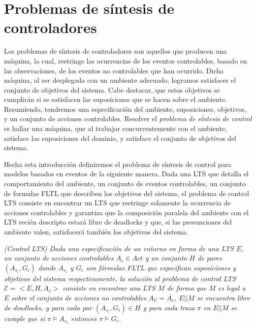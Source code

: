 \section{Problemas de síntesis de controladores}

Los problemas de síntesis de controladores son aquellos que producen una máquina, la cual, restringe las ocurrencias de
los eventos controlables, basado en las observaciones, de los eventos no controlables que han ocurrido. Dicha máquina, al
ser desplegada con un ambiente adecuado, logramos satisfacer el conjunto de objetivos del sistema. Cabe destacar, que
estos objetivos se cumplirán si se satisfacen las suposiciones que se hacen sobre el ambiente. Resumiendo, tendremos una
especificación del ambiente, suposiciones, objetivos, y un conjunto de acciones controlables. Resolver el \emph{problema
de síntesis de control} es hallar una máquina, que al trabajar concurrentemente con el ambiente, satisface las
suposiciones del dominio, y satisface el conjunto de objetivos del sistema.

Hecha esta introducción definiremos el problema de síntesis de control para modelos basados en eventos de la siguiente
manera. Dada una LTS que detalla el comportamiento del ambiente, un conjunto de eventos controlables, un conjunto de
formulas FLTL que describen los objetivos del sistema, el problema de control LTS consiste en encontrar un LTS que
restringe solamente la ocurrencia de acciones controlables y garantiza que la composición paralela del ambiente con el
LTS recién descripto estará libre de deadlocks y que, si las presunciones del ambiente valen, satisfacerá también los
objetivos del sistema.

\begin{nahaDef}
    \label{LTS_control}
    \emph{(Control LTS) Dada una especificación de un entorno en forma de una LTS $E$, un conjunto de acciones
    controlables $A_c \in Act$ y un conjunto $H$ de pares $(A_{s_i}, G_i)$ donde $A_{s_i}$ y $G_i$ son fórmulas FLTL
    que especifican suposiciones y objetivos del sistema respectivamente, la solución al problema de control LTS
    $\mathcal{E} = <E,H,A_c>$ consiste en encontrar una LTS $M$ de forma que $M$ es legal a $E$ sobre el conjunto de acciones
    no controlables $A_U = \overline{A_c}$, $E||M$ se encuentra libre de deadlocks, y para cada par $(A_{s_i}, G_i) \in
    H$ y para cada traza $\pi$ en $E||M$ se cumple que si $\pi \vDash A_{s_i}$ entonces $\pi \vDash G_i$.}
\end{nahaDef}

